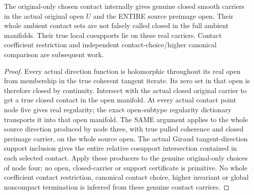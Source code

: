 \begin{theorem}
\label{hir:submersion-tangent-contact-closed-open-carriers}
\leanok
The original-only chosen contact internally gives genuine closed smooth
carriers in the actual original open $U$ and the ENTIRE source preimage open.
Their whole ambient contact sets are not falsely called closed in the full
ambient manifolds. Their true local cosupports lie on these real carriers.
Contact coefficient restriction and independent contact-choice/higher
canonical comparison are subsequent work.
\end{theorem}
\begin{proof}
Every actual direction function is holomorphic throughout its real open from
membership in the true coherent tangent iterate. Its zero set in that open
is therefore closed by continuity. Intersect with the actual closed original
carrier to get a true closed contact in the open manifold. At every actual
contact point node five gives real regularity; the exact open-subtype
regularity dictionary transports it into that open manifold. The SAME
argument applies to the whole source direction produced by node three, with
true pulled coherence and closed preimage carrier, on the whole source open.
The actual Giraud tangent-direction support inclusion gives the entire
relative cosupport intersection contained in each selected contact. Apply
these producers to the genuine original-only choices of node four; no open,
closed-carrier or support certificate is primitive. No whole coefficient
contact restriction, canonical contact choice, higher invariant or global
noncompact termination is inferred from these genuine contact carriers.
\end{proof}
